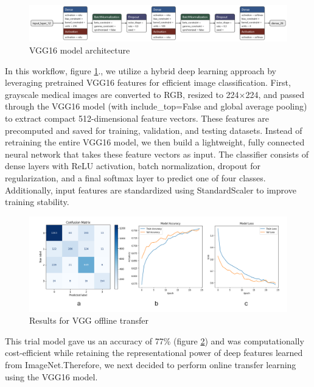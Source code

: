 \documentclass{article}
\begin{document}
\begin{figure}[h!] %
    \centering
    \includegraphics[width=1.0\linewidth]{vgg16_model1.keras(1).png}
    \caption{VGG16 model architecture}
    \label{fig:vgg16offlinemodel.png}
\end{figure}
In this workflow, figure \ref{fig:vgg16offlinemodel.png}., we utilize a hybrid deep learning approach by leveraging pretrained VGG16 features for efficient image classification. First, grayscale medical images are converted to RGB, resized to 224×224, and passed through the VGG16 model (with include\_top=False and global average pooling) to extract compact 512-dimensional feature vectors. These features are precomputed and saved for training, validation, and testing datasets. Instead of retraining the entire VGG16 model, we then build a lightweight, fully connected neural network that takes these feature vectors as input. The classifier consists of dense layers with ReLU activation, batch normalization, dropout for regularization, and a final softmax layer to predict one of four classes. Additionally, input features are standardized using StandardScaler to improve training stability.

\begin{figure}[h!] %
    \centering
    \includegraphics[width=1.0\linewidth]{vgg16_offlinetransfer.png}
    \caption{Results for VGG offline transfer}
    \label{fig:vgg16offlineresults.png}
\end{figure}

This trial model gave us an accuracy of 77\% (figure \ref{fig:vgg16offlineresults.png}) and was computationally cost-efficient while retaining the representational power of deep features learned from ImageNet.Therefore, we next decided to perform online transfer learning using the VGG16 model.
\end{document}
